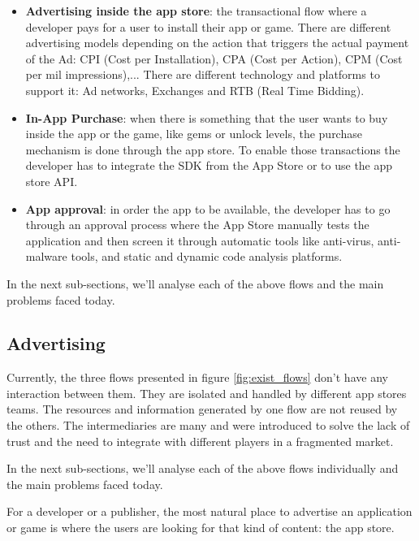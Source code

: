 \begin{itemize}
\item {\bf Advertising inside the app store}: the transactional flow where a developer pays for a user to install their app or game. There are different advertising models depending on the action that triggers the actual payment of the Ad: CPI (Cost per Installation), CPA (Cost per Action), CPM (Cost per mil impressions),... There are different technology and platforms to support it: Ad networks, Exchanges and RTB (Real Time Bidding).
\item {\bf In-App Purchase}: when there is something that the user wants to buy inside the app or the game, like gems or unlock levels, the purchase mechanism is done through the app store. To enable those transactions the developer has to integrate the SDK from the App Store or to use the app store API.
\item {\bf App approval}: in order the app to be available, the developer has to go through an approval process where the App Store manually tests the application and then screen it through automatic tools like anti-virus, anti-malware tools, and static and dynamic code analysis platforms.
\end{itemize}

In the next sub-sections, we'll analyse each of the above flows and the main problems faced today.

\subsection{Advertising}


Currently, the three flows presented in figure \ref{fig:exist_flows} don't have any interaction between them. They are isolated and handled by different app stores teams. The resources and information generated by one flow are not reused by the others. The intermediaries are many and were introduced to solve the lack of trust and the need to integrate with different players in a fragmented market.  



In the next sub-sections, we'll analyse each of the above flows individually and the main problems faced today.



For a developer or a publisher, the most natural place to advertise an application or game is where the users are looking for that kind of content: the app store.

